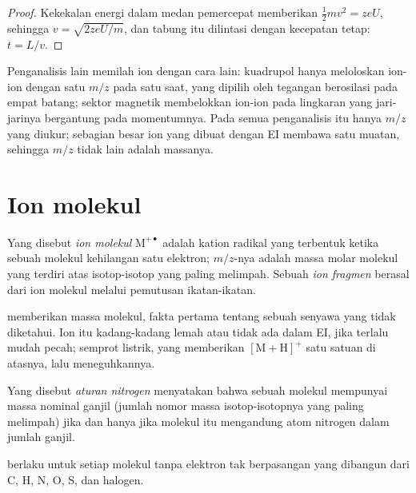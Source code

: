 \begin{proof}
Kekekalan energi dalam medan pemercepat memberikan $\tfrac12mv^2 = zeU$,
sehingga $v = \sqrt{2zeU/m}$, dan
tabung itu dilintasi dengan kecepatan tetap: $t = L/v$.
\end{proof}

Penganalisis lain memilah ion dengan cara lain: kuadrupol hanya meloloskan
ion-ion dengan satu $m/z$ pada satu saat,
yang dipilih oleh tegangan berosilasi pada empat batang; sektor magnetik
membelokkan ion-ion pada lingkaran yang jari-jarinya bergantung pada
momentumnya. Pada semua penganalisis itu hanya $m/z$ yang diukur; sebagian
besar ion yang dibuat dengan EI membawa satu muatan, sehingga $m/z$ tidak
lain adalah massanya.

\section{Ion molekul}

\begin{definition}\label{def:b2:mass-spec-atomic:molecular-ion}
Yang disebut \emph{ion molekul} $\mathrm M^{+\bullet}$
adalah kation radikal yang terbentuk ketika sebuah molekul kehilangan satu
elektron; $m/z$-nya adalah massa molar molekul yang terdiri atas
isotop-isotop yang paling melimpah. Sebuah \emph{ion fragmen}
berasal dari ion molekul melalui pemutusan ikatan-ikatan.
\end{definition}

 memberikan massa molekul, fakta pertama tentang sebuah senyawa
yang tidak diketahui. Ion itu kadang-kadang lemah atau tidak ada dalam EI,
jika  terlalu mudah pecah; semprot listrik, yang memberikan $[\mathrm M +
\mathrm H]^+$ satu satuan di atasnya, lalu meneguhkannya.

\begin{definition}\label{def:b2:mass-spec-atomic:nitrogen-rule}
Yang disebut \emph{aturan nitrogen} menyatakan bahwa
sebuah molekul mempunyai massa nominal ganjil (jumlah nomor massa
isotop-isotopnya yang paling melimpah) jika dan hanya jika molekul itu
mengandung atom nitrogen dalam jumlah ganjil.
\end{definition}

\begin{proposition}\label{prop:b2:mass-spec-atomic:nitrogen-rule}
 berlaku untuk setiap molekul tanpa elektron tak berpasangan
yang dibangun dari C, H, N, O, S, dan halogen.
\end{proposition}

